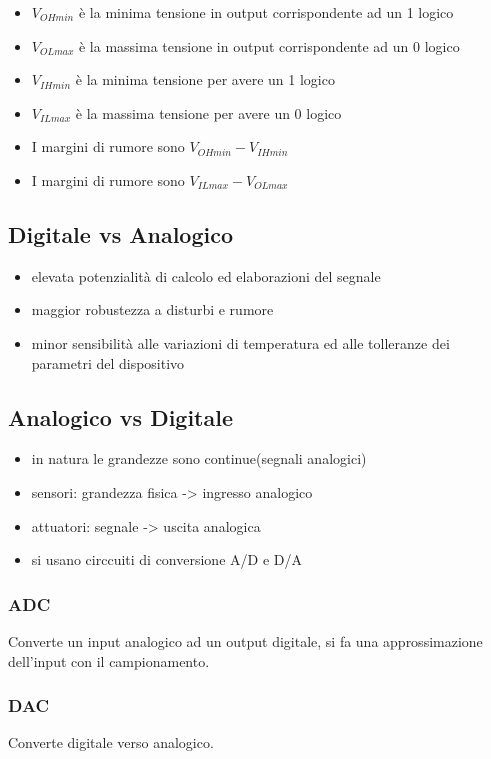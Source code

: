 \begin{itemize}
    \item $V_{OHmin}$ è la minima tensione in output corrispondente ad un 1 logico
    \item $V_{OLmax}$ è la massima tensione in output corrispondente ad un 0 logico
    \item $V_{IHmin}$ è la minima tensione per avere un 1 logico
    \item $V_{ILmax}$ è la massima tensione per avere un 0 logico
    \item I margini di rumore sono $V_{OHmin} - V_{IHmin}$
    \item I margini di rumore sono $V_{ILmax} - V_{OLmax}$
\end{itemize}

\subsection{Digitale vs Analogico}
\begin{itemize}
    \item elevata potenzialità di calcolo ed elaborazioni del segnale
    \item maggior robustezza a disturbi e rumore
    \item minor sensibilità alle variazioni di temperatura ed alle tolleranze dei parametri del dispositivo
\end{itemize}

\subsection{Analogico vs Digitale}
\begin{itemize}
    \item in natura le grandezze sono continue(segnali analogici)
    \item sensori: grandezza fisica -> ingresso analogico
    \item attuatori: segnale -> uscita analogica
    \item si usano circcuiti di conversione A/D e D/A
\end{itemize}
\subsubsection{ADC}
Converte un input analogico ad un output digitale, si fa una approssimazione dell'input con il
campionamento.

\subsubsection{DAC}
Converte digitale verso analogico.

